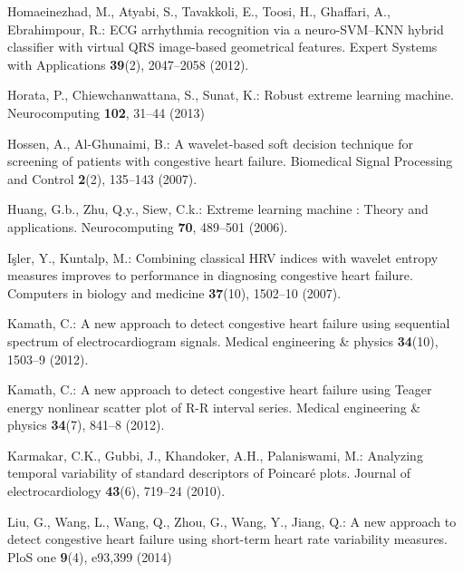 \documentclass[twocolumn]{svjour3}
\begin{document}
\begin{thebibliography}{10}
Homaeinezhad, M., Atyabi, S., Tavakkoli, E., Toosi, H., Ghaffari, A.,
  Ebrahimpour, R.: {ECG arrhythmia recognition via a neuro-SVM–KNN hybrid
  classifier with virtual QRS image-based geometrical features}.
\newblock Expert Systems with Applications \textbf{39}(2), 2047--2058 (2012).
\newblock {}

Horata, P., Chiewchanwattana, S., Sunat, K.: {Robust extreme learning machine}.
\newblock Neurocomputing \textbf{102}, 31--44 (2013)

Hossen, A., Al-Ghunaimi, B.: {A wavelet-based soft decision technique for
  screening of patients with congestive heart failure}.
\newblock Biomedical Signal Processing and Control \textbf{2}(2), 135--143
  (2007).
\newblock {}

Huang, G.b., Zhu, Q.y., Siew, C.k.: {Extreme learning machine : Theory and
  applications}.
\newblock Neurocomputing \textbf{70}, 489--501 (2006).
\newblock {}

I\c{s}ler, Y., Kuntalp, M.: {Combining classical HRV indices with wavelet
  entropy measures improves to performance in diagnosing congestive heart
  failure.}
\newblock Computers in biology and medicine \textbf{37}(10), 1502--10 (2007).
\newblock {}

Kamath, C.: {A new approach to detect congestive heart failure using sequential
  spectrum of electrocardiogram signals.}
\newblock Medical engineering {\&} physics \textbf{34}(10), 1503--9 (2012).
\newblock {}

Kamath, C.: {A new approach to detect congestive heart failure using Teager
  energy nonlinear scatter plot of R-R interval series.}
\newblock Medical engineering {\&} physics \textbf{34}(7), 841--8 (2012).
\newblock {}

Karmakar, C.K., Gubbi, J., Khandoker, A.H., Palaniswami, M.: {Analyzing
  temporal variability of standard descriptors of Poincar{\'{e}} plots.}
\newblock Journal of electrocardiology \textbf{43}(6), 719--24 (2010).
\newblock {}

Liu, G., Wang, L., Wang, Q., Zhou, G., Wang, Y., Jiang, Q.: A new approach to
  detect congestive heart failure using short-term heart rate variability
  measures.
\newblock PloS one \textbf{9}(4), e93,399 (2014)


\end{thebibliography}
\end{document}
